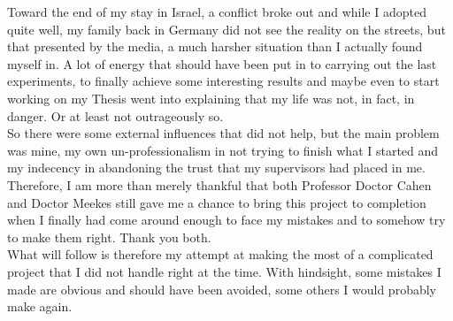 \begin{personalintro}
Toward the end of my stay in Israel, a conflict broke out and while I adopted quite well, my family back in Germany did not see the reality on the streets, but that presented by the media, a much harsher situation than I actually found myself in. A lot of energy that should have been put in to carrying out the last experiments, to finally achieve some interesting results and maybe even to start working on my Thesis went into explaining that my life was not, in fact, in danger. Or at least not outrageously so.\\
So there were some external influences that did not help, but the main problem was mine, my own un-professionalism in not trying to finish what I started and my indecency in abandoning the trust that my supervisors had placed in me.\\
Therefore, I am more than merely thankful that both Professor Doctor Cahen and Doctor Meekes still gave me a chance to bring this project to completion when I finally had come around enough to face my mistakes and to somehow try to make them right. Thank you both.\\
What will follow is therefore my attempt at making the most of a complicated project that I did not handle right at the time. With hindsight, some mistakes I made are obvious and should have been avoided, some others I would probably make again.\\

\end{personalintro}